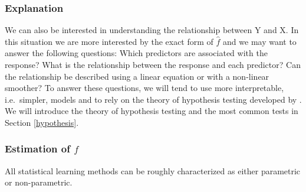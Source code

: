 \documentclass[]{book}
\begin{document}
\hypertarget{explanation}{%
\subsubsection*{Explanation}\label{explanation}}

We can also be interested in understanding the relationship between
\(\mathrm{Y}\) and \(\mathrm{X}\). In this situation we are more interested by the exact
form of \(\hat{f}\) and we may want to answer the following questions:
Which predictors are associated with the response? What is the
relationship between the response and each predictor? Can the
relationship be described using a linear equation or with a non-linear
smoother? To answer these questions, we will tend to use more
interpretable, i.e.~simpler, models and to rely on the theory of
hypothesis testing developed by \citep{neyman1933testing}. We will introduce
the theory of hypothesis testing and the most common tests in Section
\ref{hypothesis}.

\hypertarget{estimation-of-f}{%
\subsubsection*{\texorpdfstring{Estimation of \(f\)}{Estimation of f}}\label{estimation-of-f}}

All statistical learning methods can be roughly characterized as either
parametric or non-parametric.
\end{document}
